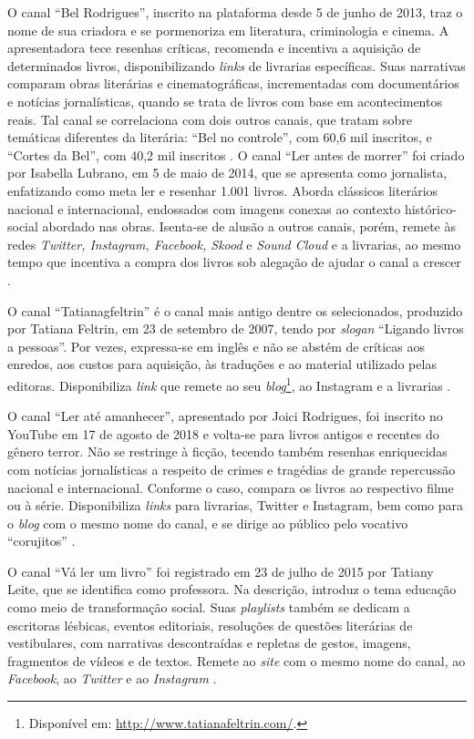 \documentclass[portuguese]{textolivre}
\begin{document}
O canal ``Bel Rodrigues'', inscrito na plataforma desde 5 de junho de
2013, traz o nome de sua criadora e se pormenoriza em literatura,
criminologia e cinema. A apresentadora tece resenhas críticas, recomenda
e incentiva a aquisição de determinados livros, disponibilizando
\emph{links} de livrarias específicas. Suas narrativas comparam obras
literárias e cinematográficas, incrementadas com documentários e
notícias jornalísticas, quando se trata de livros com base em
acontecimentos reais. Tal canal se correlaciona com dois outros canais,
que tratam sobre temáticas diferentes da literária: ``Bel no controle'',
com 60,6 mil inscritos, e ``Cortes da Bel'', com 40,2 mil inscritos
\cite{rodrigues2021}.%
O canal ``Ler antes de morrer'' foi criado por Isabella Lubrano, em 5 de
maio de 2014, que se apresenta como jornalista, enfatizando como meta
ler e resenhar 1.001 livros. Aborda clássicos literários nacional e
internacional, endossados com imagens conexas ao contexto
histórico-social abordado nas obras. Isenta-se de alusão a outros
canais, porém, remete às redes \emph{Twitter, Instagram, Facebook, Skood
}e \emph{Sound Cloud} e a livrarias, ao mesmo tempo que incentiva a
compra dos livros sob alegação de ajudar o canal a crescer \cite{lubrano2021}. %

O canal ``Tatianagfeltrin'' é o canal mais antigo dentre os
selecionados, produzido por Tatiana Feltrin, em 23 de setembro de 2007,
tendo por \emph{slogan} ``Ligando livros a pessoas''. Por vezes,
expressa-se em inglês e não se abstém de críticas aos enredos, aos
custos para aquisição, às traduções e ao material utilizado pelas
editoras. Disponibiliza \emph{link} que remete ao seu
\emph{blog}\footnote{ Disponível em: \url{http://www.tatianafeltrin.com/}.},
ao Instagram e a livrarias \cite{feltrin2021}. %

O canal ``Ler até amanhecer'', apresentado por Joici Rodrigues, foi
inscrito no YouTube em 17 de agosto de 2018 e volta-se para livros
antigos e recentes do gênero terror. Não se restringe à ficção, tecendo
também resenhas enriquecidas com notícias jornalísticas a respeito de
crimes e tragédias de grande repercussão nacional e internacional.
Conforme o caso, compara os livros ao respectivo filme ou à série.
Disponibiliza \emph{links} para livrarias, Twitter e Instagram, bem como
para o \emph{blog} com o mesmo nome do canal, e se dirige ao público
pelo vocativo ``corujitos'' \cite{rodriguesjoici2021}. %

O canal ``Vá ler um livro'' foi registrado em 23 de julho de 2015 por
Tatiany Leite, que se identifica como professora. Na descrição, introduz
o tema educação como meio de transformação social. Suas \emph{playlists}
também se dedicam a escritoras lésbicas, eventos editoriais, resoluções
de questões literárias de vestibulares, com narrativas descontraídas e
repletas de gestos, imagens, fragmentos de vídeos e de textos. Remete ao
\emph{site} com o mesmo nome do canal, ao \emph{Facebook}, ao
\emph{Twitter} e ao \emph{Instagram} \cite{leite2021}. %
\end{document}
